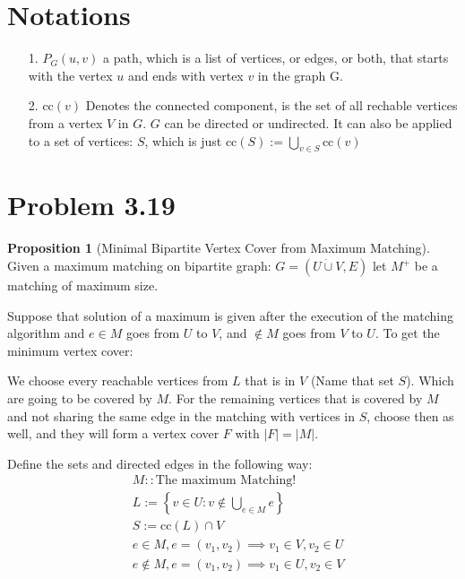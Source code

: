 \documentclass[]{article}
\theoremstyle{definition}
\newtheorem{prop}{Proposition}[section]  %
\begin{document}
\section*{Notations}
\begin{itemize}
    \item [1.] $P_G(u, v)$ a path, which is a list of vertices, or edges, or both, that starts with the vertex $u$ and ends with vertex $v$ in the graph G. 
    \item [2. ] $\text{cc}(v)$ Denotes the connected component, is the set of all rechable vertices from a vertex $V$ in $G$. $G$ can be directed or undirected. It can also be applied to a set of vertices: $S$, which is just $\text{cc}(S):= \bigcup_{v\in S}\text{cc}(v)$
\end{itemize}
\section{Problem 3.19}
    \begin{prop}[Minimal Bipartite Vertex Cover from Maximum Matching]\label{prop:konig}
        Given a maximum matching on bipartite graph: $G=(U\dot\cup V, E)$ let $M^+$ be a matching of maximum size. 
        \par
        Suppose that solution of a maximum is given after the execution of the matching algorithm and $e\in M$ goes from $U$ to $V$, and $\not\in M$ goes from $V$ to $U$. To get the minimum vertex cover:
        \par
        We choose every reachable vertices from $L$ that is in $V$ (Name that set $S$). Which are going to be covered by $M$. For the remaining vertices that is covered by $M$ and not sharing the same edge in the matching with vertices in $S$, choose then as well, and they will form a vertex cover $F$ with $|F| = |M|$. 
    \end{prop}
    Define the sets and directed edges in the following way: 
    \begin{align}
        & M::\text{The maximum Matching!}
        \\
        & L := \left\lbrace
            v\in U: v\not \in \bigcup_{e\in M} e
        \right\rbrace
        \\
        & S := \text{cc}(L)\cap V
        \\
        & e\in M, e=(v_1, v_2) \implies v_1\in V, v_2\in U
        \\
        & e\not\in M, e=(v_1, v_2) \implies v_1\in U, v_2\in V
    \end{align}
\end{document}
